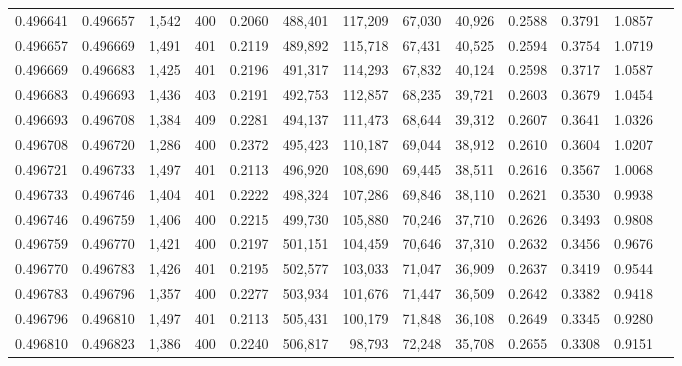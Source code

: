 \begin{tabular}{rrrrrrrrrrrrr}
0.496641 & 0.496657 & 1,542 & 400 &                                     0.2060 & 488,401 & 117,209 &  67,030 &  40,926 & 0.2588 & 0.3791 & 1.0857 \\
0.496657 & 0.496669 & 1,491 & 401 &                                     0.2119 & 489,892 & 115,718 &  67,431 &  40,525 & 0.2594 & 0.3754 & 1.0719 \\
0.496669 & 0.496683 & 1,425 & 401 &                                     0.2196 & 491,317 & 114,293 &  67,832 &  40,124 & 0.2598 & 0.3717 & 1.0587 \\
0.496683 & 0.496693 & 1,436 & 403 &                                     0.2191 & 492,753 & 112,857 &  68,235 &  39,721 & 0.2603 & 0.3679 & 1.0454 \\
0.496693 & 0.496708 & 1,384 & 409 &                                     0.2281 & 494,137 & 111,473 &  68,644 &  39,312 & 0.2607 & 0.3641 & 1.0326 \\
0.496708 & 0.496720 & 1,286 & 400 &                                     0.2372 & 495,423 & 110,187 &  69,044 &  38,912 & 0.2610 & 0.3604 & 1.0207 \\
0.496721 & 0.496733 & 1,497 & 401 &                                     0.2113 & 496,920 & 108,690 &  69,445 &  38,511 & 0.2616 & 0.3567 & 1.0068 \\
0.496733 & 0.496746 & 1,404 & 401 &                                     0.2222 & 498,324 & 107,286 &  69,846 &  38,110 & 0.2621 & 0.3530 & 0.9938 \\
0.496746 & 0.496759 & 1,406 & 400 &                                     0.2215 & 499,730 & 105,880 &  70,246 &  37,710 & 0.2626 & 0.3493 & 0.9808 \\
0.496759 & 0.496770 & 1,421 & 400 &                                     0.2197 & 501,151 & 104,459 &  70,646 &  37,310 & 0.2632 & 0.3456 & 0.9676 \\
0.496770 & 0.496783 & 1,426 & 401 &                                     0.2195 & 502,577 & 103,033 &  71,047 &  36,909 & 0.2637 & 0.3419 & 0.9544 \\
0.496783 & 0.496796 & 1,357 & 400 &                                     0.2277 & 503,934 & 101,676 &  71,447 &  36,509 & 0.2642 & 0.3382 & 0.9418 \\
0.496796 & 0.496810 & 1,497 & 401 &                                     0.2113 & 505,431 & 100,179 &  71,848 &  36,108 & 0.2649 & 0.3345 & 0.9280 \\
0.496810 & 0.496823 & 1,386 & 400 &                                     0.2240 & 506,817 &  98,793 &  72,248 &  35,708 & 0.2655 & 0.3308 & 0.9151 \\

\end{tabular}
